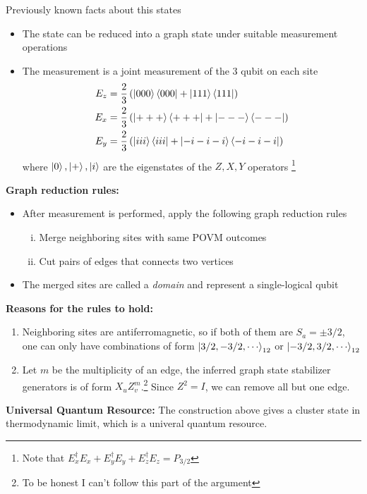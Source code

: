 \documentclass[aspectratio=169,xcolor=dvipsnames, t]{beamer}
\begin{document}
\begin{frame}{Previously known facts about this states} 
    \begin{itemize}
        \item The state can be reduced into a graph state under suitable measurement operations \cite{wei2011_aklt_honeycomb}
        \item The measurement is a joint measurement of the 3 qubit on each site
        \begin{align*}
            E_z &= \frac{2}{3} \left(\ket{000}\bra{000}+\ket{111}\bra{111}\right) \\
            E_x &= \frac{2}{3} \left(\ket{+++}\bra{+++}+\ket{---}\bra{---}\right) \\
            E_y &= \frac{2}{3} \left(\ket{iii}\bra{iii}+\ket{-i-i-i}\bra{-i-i-i}\right)  
        \end{align*}
        where $\ket{0},\ket{+},\ket{i}$ are the eigenstates of the $Z,X,Y$ operators \footnote{Note that $E^\dagger_x E_x+E_y^\dagger E_y+ E^\dagger_zE_z = P_{3/2}$}
    \end{itemize}
\end{frame}

\begin{frame}
    \textbf{Graph reduction rules:}
    \begin{itemize}
        \item After measurement is performed, apply the following graph reduction rules
        \begin{enumerate}[(i)]
            \item Merge neighboring sites with same POVM outcomes
            \item Cut pairs of edges that connects two vertices
        \end{enumerate}
        \item The merged sites are called a \textit{domain} and represent a single-logical qubit
    \end{itemize}
    \vspace{.5cm}
    \textbf{Reasons for the rules to hold:}
    \begin{enumerate}
        \item Neighboring sites are antiferromagnetic, so if both of them are $S_a=\pm 3/2$, one can only have combinations of form $\ket{3/2, -3/2,\cdots}_{12}$ or $\ket{-3/2, 3/2,\cdots}_{12}$ 
        \item Let $m$ be the multiplicity of an edge, the inferred graph state stabilizer generators is of form $X_u Z_v^m$.\footnote{To be honest I can't follow this part of the argument} Since $Z^2=I$, we can remove all but one edge.
    \end{enumerate}
    \vspace{.5cm}
    \textbf{Universal Quantum Resource: }The construction above gives a cluster state in thermodynamic limit, which is a univeral quantum resource.
\end{frame}
\end{document}
